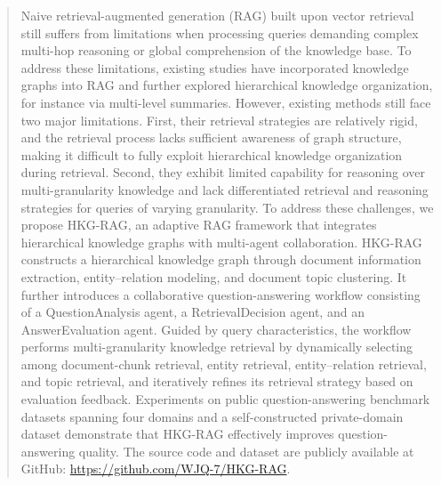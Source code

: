\documentclass{elsarticle}
\begin{document}
\begin{frontmatter}

\begin{abstract}
Naive retrieval-augmented generation (RAG) built upon vector retrieval still suffers from limitations when processing queries demanding complex multi-hop reasoning or global comprehension of the knowledge base. To address these limitations, existing studies have incorporated knowledge graphs into RAG and further explored hierarchical knowledge organization, for instance via multi-level summaries. However, existing methods still face two major limitations. First, their retrieval strategies are relatively rigid, and the retrieval process lacks sufficient awareness of graph structure, making it difficult to fully exploit hierarchical knowledge organization during retrieval. Second, they exhibit limited capability for reasoning over multi-granularity knowledge and lack differentiated retrieval and reasoning strategies for queries of varying granularity. To address these challenges, we propose HKG-RAG, an adaptive RAG framework that integrates hierarchical knowledge graphs with multi-agent collaboration. HKG-RAG constructs a hierarchical knowledge graph through document information extraction, entity--relation modeling, and document topic clustering. It further introduces a collaborative question-answering workflow consisting of a QuestionAnalysis agent, a RetrievalDecision agent, and an AnswerEvaluation agent. Guided by query characteristics, the workflow performs multi-granularity knowledge retrieval by dynamically selecting among document-chunk retrieval, entity retrieval, entity--relation retrieval, and topic retrieval, and iteratively refines its retrieval strategy based on evaluation feedback. Experiments on public question-answering benchmark datasets spanning four domains and a self-constructed private-domain dataset demonstrate that HKG-RAG effectively improves question-answering quality. The source code and dataset are publicly available at GitHub:
\url{https://github.com/WJQ-7/HKG-RAG}.
\end{abstract}

\end{frontmatter}
\end{document}
